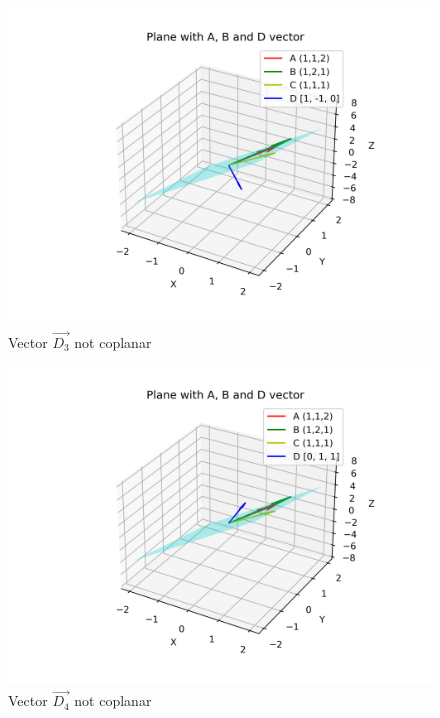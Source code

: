 \documentclass[12pt]{article}
\begin{document}
\begin{figure}[H]
    \centering
    \includegraphics[width=0.6\linewidth]{figures/plane_3.png}
    \caption{Vector $\vec{D_3}$ not coplanar}
\end{figure}

\begin{figure}[H]
    \centering
    \includegraphics[width=0.6\linewidth]{figures/plane_4.png}
    \caption{Vector $\vec{D_4}$ not coplanar}
\end{figure}
\end{document}
